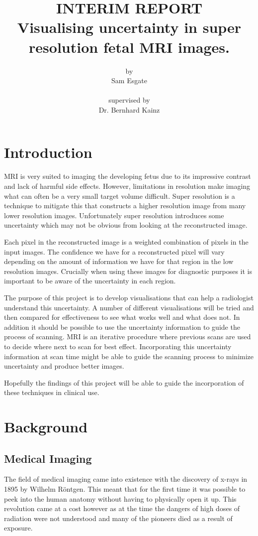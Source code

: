 \documentclass[
  oneside,
  11pt, a4paper,
  footinclude=true,
  headinclude=true,
  cleardoublepage=empty
]{scrbook}
\title{INTERIM REPORT\\Visualising uncertainty in super resolution fetal MRI images.}
\author{by\\Sam Esgate\\\\supervised by\\Dr. Bernhard Kainz}
\begin{document}
\maketitle



\chapter{Introduction}
MRI is very suited to imaging the developing fetus due to its impressive contrast and lack of harmful side effects. However, limitations in resolution make imaging what can often be a very small target volume difficult. Super resolution is a technique to mitigate this that constructs a higher resolution image from many lower resolution images. Unfortunately super resolution introduces some uncertainty which may not be obvious from looking at the reconstructed image.

Each pixel in the reconstructed image is a weighted combination of pixels in the input images. The confidence we have for a reconstructed pixel will vary depending on the amount of information we have for that region in the low resolution images. Crucially when using these images for diagnostic purposes it is important to be aware of the uncertainty in each region.

The purpose of this project is to develop visualisations that can help a radiologist understand this uncertainty. A number of different visualisations will be tried and then compared for effectiveness to see what works well and what does not. In addition it should be possible to use the uncertainty information to guide the process of scanning. MRI is an iterative procedure where previous scans are used to decide where next to scan for best effect. Incorporating this uncertainty information at scan time might be able to guide the scanning process to minimize uncertainty and produce better images.

Hopefully the findings of this project will be able to guide the incorporation of these techniques in clinical use.

\chapter{Background}

\section{Medical Imaging}
The field of medical imaging came into existence with the discovery of x-rays in 1895 by Wilhelm R\"{o}ntgen\cite{rontgen}. This meant that for the first time it was possible to peek into the human anatomy without having to physically open it up. This revolution came at a cost however as at the time the dangers of high doses of radiation were not understood and many of the pioneers died as a result of exposure\cite{xraydeath}.
\end{document}
